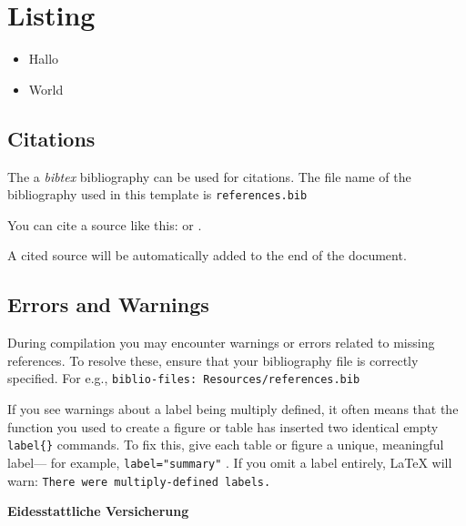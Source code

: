 \documentclass[11pt,a4paper]{article}
\begin{document}
\section{Listing}\label{listing}

\begin{itemize}
  \item Hallo 
  \item World
\end{itemize}

\pagebreak

\subsection{Citations}\label{citations}

The a \emph{bibtex} bibliography can be used for citations. The file
name of the bibliography used in this template is
\texttt{references.bib}

You can cite a source like this: \autocite{Keil_2012} or
\textcite{Litterman1986}.

A cited source will be automatically added to the end of the document.

\pagebreak

\subsection{Errors and Warnings}\label{errors-and-warnings}

During compilation you may encounter warnings or errors related to
missing references. To resolve these, ensure that your bibliography file
is correctly specified. For e.g.,
\texttt{biblio-files:\ Resources/references.bib}

If you see warnings about a label being multiply defined, it often means
that the function you used to create a figure or table has inserted two
identical empty \texttt{label\{\}} commands. To fix this, give each
table or figure a unique, meaningful label--- for example,
\texttt{label="summary"} . If you omit a label entirely, LaTeX will
warn: \texttt{There\ were\ multiply-defined\ labels.}

\pagebreak
\renewcommand*{\mkbibnamefamily}[1]{\textbf{#1}}
\renewcommand*{\mkbibnamegiven}[1]{\textbf{#1}}
\renewcommand*{\mkbibnameprefix}[1]{\textbf{#1}}
\renewcommand*{\mkbibnamesuffix}[1]{\textbf{#1}}
\printbibliography[title=References]

\newpage
\textbf{Eidesstattliche Versicherung}

\bigskip
\end{document}
